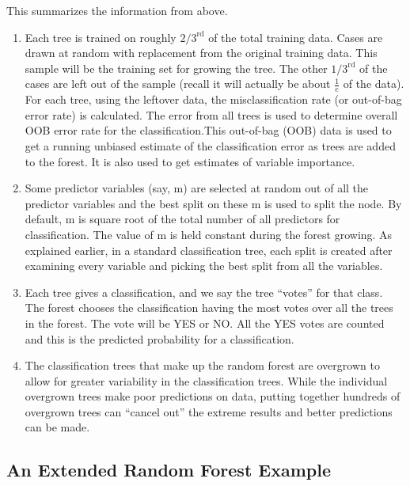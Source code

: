 \documentclass[12pt,twoside]{reedthesis}
\begin{document}
  This summarizes the information from above.
  
  \begin{enumerate}
  \def\labelenumi{\arabic{enumi}.}
  \item
    Each tree is trained on roughly \(2/3^{\text{rd}}\) of the total
    training data. Cases are drawn at random with replacement from the
    original training data. This sample will be the training set for
    growing the tree. The other \(1/3^{\text{rd}}\) of the cases are left
    out of the sample (recall it will actually be about \(\frac{1}{e}\) of
    the data). For each tree, using the leftover data, the
    misclassification rate (or out-of-bag error rate) is calculated. The
    error from all trees is used to determine overall OOB error rate for
    the classification.This out-of-bag (OOB) data is used to get a running
    unbiased estimate of the classification error as trees are added to
    the forest. It is also used to get estimates of variable importance.
  \item
    Some predictor variables (say, m) are selected at random out of all
    the predictor variables and the best split on these m is used to split
    the node. By default, m is square root of the total number of all
    predictors for classification. The value of m is held constant during
    the forest growing. As explained earlier, in a standard classification
    tree, each split is created after examining every variable and picking
    the best split from all the variables.
  \item
    Each tree gives a classification, and we say the tree ``votes'' for
    that class. The forest chooses the classification having the most
    votes over all the trees in the forest. The vote will be YES or NO.
    All the YES votes are counted and this is the predicted probability
    for a classification.
  \item
    The classification trees that make up the random forest are overgrown
    to allow for greater variability in the classification trees. While
    the individual overgrown trees make poor predictions on data, putting
    together hundreds of overgrown trees can ``cancel out'' the extreme
    results and better predictions can be made.
  \end{enumerate}
  
  \subsection{An Extended Random Forest
  Example}\label{an-extended-random-forest-example}
  
\end{document}
